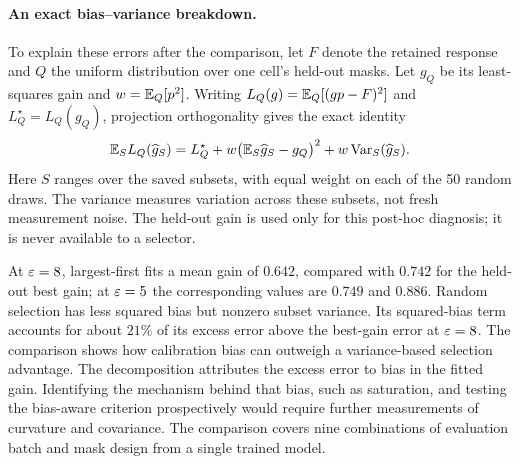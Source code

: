 \paragraph{An exact bias--variance breakdown.}
To explain these errors after the comparison, let $F$ denote the retained
response and $Q$ the uniform distribution over one cell's held-out masks.
Let $g_Q$ be its least-squares gain and $w=\mathbb{E}_Q[p^2]$.
Writing $L_Q(g)=\mathbb{E}_Q[(gp-F)^2]$ and
$L_Q^\star=L_Q(g_Q)$, projection orthogonality gives the exact identity
\begin{equation}\label{eq:bd-empirical-decomposition}
 \mathbb{E}_S L_Q(\widehat g_S)
 =L_Q^\star+w\bigl(\mathbb{E}_S\widehat g_S-g_Q\bigr)^2
   +w\operatorname{Var}_S(\widehat g_S).
\end{equation}
Here $S$ ranges over the saved subsets, with equal weight on each of the 50
random draws. The variance measures variation across these subsets, not fresh
measurement noise. The held-out gain is used only for this post-hoc diagnosis;
it is never available to a selector.

At $\varepsilon=8$, largest-first fits a mean gain of $0.642$, compared with $0.742$
for the held-out best gain; at $\varepsilon=5$ the corresponding values are $0.749$
and $0.886$. Random selection has less squared bias but nonzero subset variance.
Its squared-bias term accounts for about $21\%$ of its excess error above the
best-gain error at $\varepsilon=8$. The comparison shows how calibration bias can
outweigh a variance-based selection advantage. The decomposition attributes
the excess error to bias in the fitted gain. Identifying the mechanism behind
that bias, such as saturation, and testing the bias-aware criterion
prospectively would require further measurements of curvature and covariance.
The comparison covers nine combinations of evaluation batch and mask design
from a single trained model.
\FloatBarrier

